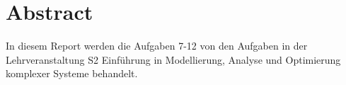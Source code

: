 \chapter{Abstract}

In diesem Report werden die Aufgaben 7-12 von den Aufgaben in der Lehrveranstaltung S2 Einführung in Modellierung, Analyse und Optimierung komplexer Systeme behandelt.